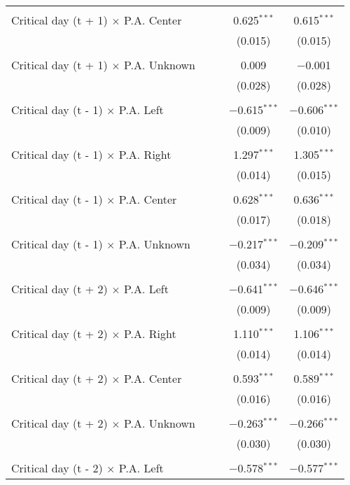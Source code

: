 \documentclass[
]{article}
\begin{document}
\begin{table}[!htbp]
{\begin{tabular}{@{\extracolsep{5pt}}lcccc}
  & & & & \\ 
 Critical day (t + 1) $\times$ P.A. Center &  &  & 0.625$^{***}$ & 0.615$^{***}$ \\ 
  &  &  & (0.015) & (0.015) \\ 
  & & & & \\ 
 Critical day (t + 1) $\times$ P.A. Unknown &  &  & 0.009 & $-$0.001 \\ 
  &  &  & (0.028) & (0.028) \\ 
  & & & & \\ 
 Critical day (t - 1) $\times$ P.A. Left &  &  & $-$0.615$^{***}$ & $-$0.606$^{***}$ \\ 
  &  &  & (0.009) & (0.010) \\ 
  & & & & \\ 
 Critical day (t - 1) $\times$ P.A. Right &  &  & 1.297$^{***}$ & 1.305$^{***}$ \\ 
  &  &  & (0.014) & (0.015) \\ 
  & & & & \\ 
 Critical day (t - 1) $\times$ P.A. Center &  &  & 0.628$^{***}$ & 0.636$^{***}$ \\ 
  &  &  & (0.017) & (0.018) \\ 
  & & & & \\ 
 Critical day (t - 1) $\times$ P.A. Unknown &  &  & $-$0.217$^{***}$ & $-$0.209$^{***}$ \\ 
  &  &  & (0.034) & (0.034) \\ 
  & & & & \\ 
 Critical day (t + 2) $\times$ P.A. Left &  &  & $-$0.641$^{***}$ & $-$0.646$^{***}$ \\ 
  &  &  & (0.009) & (0.009) \\ 
  & & & & \\ 
 Critical day (t + 2) $\times$ P.A. Right &  &  & 1.110$^{***}$ & 1.106$^{***}$ \\ 
  &  &  & (0.014) & (0.014) \\ 
  & & & & \\ 
 Critical day (t + 2) $\times$ P.A. Center &  &  & 0.593$^{***}$ & 0.589$^{***}$ \\ 
  &  &  & (0.016) & (0.016) \\ 
  & & & & \\ 
 Critical day (t + 2) $\times$ P.A. Unknown &  &  & $-$0.263$^{***}$ & $-$0.266$^{***}$ \\ 
  &  &  & (0.030) & (0.030) \\ 
  & & & & \\ 
 Critical day (t - 2) $\times$ P.A. Left &  &  & $-$0.578$^{***}$ & $-$0.577$^{***}$ \\ 

\end{tabular}}
\end{table}
\end{document}
